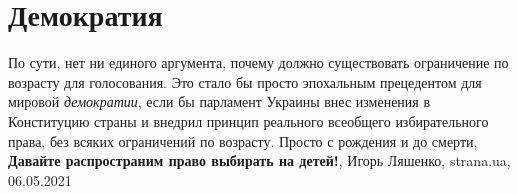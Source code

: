  
 
 
 
 
\chapter{Демократия}

По сути, нет ни единого аргумента, почему должно существовать ограничение по
возрасту для голосования. Это стало бы просто эпохальным прецедентом для
мировой \emph{демократии}, если бы парламент Украины внес изменения в
Конституцию страны и внедрил принцип реального всеобщего избирательного права,
без всяких ограничений по возрасту.  Просто с рождения и до смерти,
\textbf{Давайте распространим право выбирать на детей!},
Игорь Ляшенко, strana.ua, 06.05.2021

